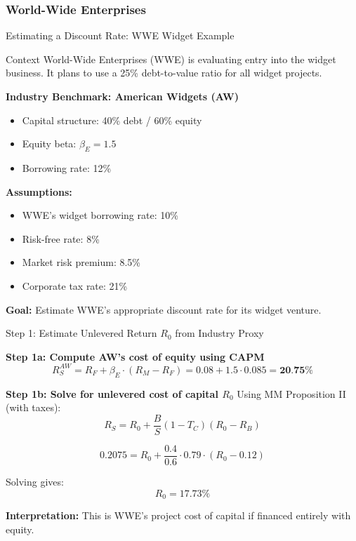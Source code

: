\subsubsection{World-Wide Enterprises}
\begin{frame}{Estimating a Discount Rate: WWE Widget Example}
	
	\begin{block}{Context}
		World-Wide Enterprises (WWE) is evaluating entry into the widget business. It plans to use a 25\% debt-to-value ratio for all widget projects.
	\end{block}
	
	\vspace{0.2cm}
	\textbf{Industry Benchmark: American Widgets (AW)}
	\begin{itemize}
		\item Capital structure: 40\% debt / 60\% equity
		\item Equity beta: \( \beta_E = 1.5 \)
		\item Borrowing rate: 12\%
	\end{itemize}
	
	\vspace{0.2cm}
	\textbf{Assumptions:}
	\begin{itemize}
		\item WWE's widget borrowing rate: 10\%
		\item Risk-free rate: 8\%
		\item Market risk premium: 8.5\%
		\item Corporate tax rate: 21\%
	\end{itemize}
	
	\vspace{0.2cm}
	\textbf{Goal:}  
	Estimate WWE’s appropriate discount rate for its widget venture.
	
\end{frame}
\begin{frame}{Step 1: Estimate Unlevered Return \( R_0 \) from Industry Proxy}
	
	\textbf{Step 1a: Compute AW’s cost of equity using CAPM}
	\[
	R_S^{AW} = R_F + \beta_E \cdot (R_M - R_F) = 0.08 + 1.5 \cdot 0.085 = \textbf{20.75\%}
	\]
	
	\vspace{0.3cm}
	\textbf{Step 1b: Solve for unlevered cost of capital \( R_0 \)}  
	Using MM Proposition II (with taxes):
	\[
	R_S = R_0 + \frac{B}{S}(1 - T_C)(R_0 - R_B)
	\]
	
	\[
	0.2075 = R_0 + \frac{0.4}{0.6} \cdot 0.79 \cdot (R_0 - 0.12)
	\]
	
	Solving gives:  
	\[
	\boxed{R_0 = 17.73\%}
	\]
	
	\textbf{Interpretation:}  
	This is WWE's project cost of capital if financed entirely with equity.
	
\end{frame}
